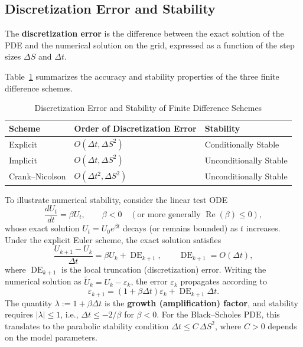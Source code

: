 \subsection{Discretization Error and Stability}
\begin{definition}
    \label{def:ch04-discretization-error}
    The \textbf{discretization error} is the difference between the exact solution of the PDE and the numerical solution on the grid, expressed as a function of the step sizes $\Delta S$ and $\Delta t$.
\end{definition}

Table~\ref{tab:ch04-fd-schemes} summarizes the accuracy and stability properties of the three finite difference schemes.

\begin{table}[!ht]
    \centering
    \caption{Discretization Error and Stability of Finite Difference Schemes}
    \label{tab:ch04-fd-schemes}
    \begin{tabular}{lll}
        \toprule
        \textbf{Scheme} & \textbf{Order of Discretization Error} & \textbf{Stability} \\
        \midrule
        Explicit & $O(\Delta t, \Delta S^2)$ & Conditionally Stable \\
        Implicit & $O(\Delta t, \Delta S^2)$ & Unconditionally Stable \\
        Crank--Nicolson & $O(\Delta t^2, \Delta S^2)$ & Unconditionally Stable \\
        \bottomrule
    \end{tabular}
\end{table}

To illustrate numerical stability, consider the linear test ODE
\[
    \frac{dU_t}{dt} = \beta U_t, \qquad \beta < 0 \quad (\text{or more generally } \operatorname{Re}(\beta) \le 0),
\]
whose exact solution $U_t = U_0 e^{\beta t}$ decays (or remains bounded) as $t$ increases. Under the explicit Euler scheme, the exact solution satisfies
\[
    \frac{U_{k+1} - U_k}{\Delta t} = \beta U_k + \operatorname{DE}_{k+1}, \qquad \operatorname{DE}_{k+1} = O(\Delta t),
\]
where $\operatorname{DE}_{k+1}$ is the local truncation (discretization) error. Writing the numerical solution as $\widetilde{U}_k = U_k - \varepsilon_k$, the error $\varepsilon_k$ propagates according to
\[
    \varepsilon_{k+1} = (1 + \beta \Delta t)\varepsilon_k + \operatorname{DE}_{k+1}\Delta t.
\]
The quantity $\lambda := 1 + \beta \Delta t$ is the \textbf{growth (amplification) factor}, and stability requires $|\lambda| \le 1$, i.e., $\Delta t \le -2/\beta$ for $\beta < 0$. For the Black--Scholes PDE, this translates to the parabolic stability condition $\Delta t \le C\,\Delta S^2$, where $C > 0$ depends on the model parameters.

